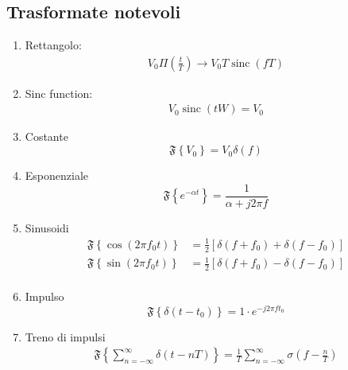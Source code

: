 \subsection{Trasformate notevoli}
\begin{enumerate}
	\item Rettangolo:
	      \begin{align*}
		      V_0 \Pi  \left(\frac{t}{T}\right) \rightarrow  V_0 T \operatorname{sinc}\left(f T\right)
	      \end{align*}
	\item Sinc function:
	      \begin{align*}
		      V_0 \operatorname{sinc} \left(t W\right) = V_0
	      \end{align*}
	\item Costante
	      \[
		      \mathfrak{F} \left\{V_0\right\}= V_0 \delta  \left(f\right)
	      \]
	\item Esponenziale
	      \[
		      \mathfrak{F} \left\{e^{-\alpha t}\right\} = \frac{1}{\alpha  + j 2 \pi  f}
	      \]
	\item Sinusoidi
	      \begin{align*}
		      \mathfrak{F}\left\{\cos \left(2 \pi f_0 t\right)\right\}  & = \frac{1}{2}\left[\delta\left(f+f_0\right)+\delta\left(f-f_0\right)\right] \\
		      \mathfrak{F}\left\{\sin  \left(2 \pi f_0 t\right)\right\} & = \frac{1}{2}\left[\delta\left(f+f_0\right)-\delta\left(f-f_0\right)\right] \\
	      \end{align*}
	\item Impulso
	      \[
		      \mathfrak{F}\left\{\delta \left(t- t_0\right)\right\} = 1 \cdot e ^{ -j 2 \pi  f t_0}
	      \]
	\item Treno di impulsi
	      \begin{align*}
		      \mathfrak{F}\left\{\sum_{n= -\infty }^{\infty} \delta \left(t - nT\right)\right\} = \frac{1}{T} \sum_{n= -\infty}^{\infty} \sigma \left(f - \frac{n}{T}\right)
	      \end{align*}
\end{enumerate}

